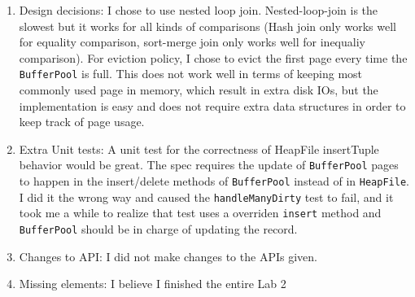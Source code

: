 \documentclass[10pt]{myland}
\begin{document}
\begin{enumerate}[label=\textbf{\arabic*.}, listparindent=0.0em, itemsep=1em]
    \item Design decisions: I chose to use nested loop join. Nested-loop-join is the slowest but it works for all kinds
        of comparisons (Hash join only works well for equality comparison, sort-merge join only works well for inequaliy
        comparison). For eviction policy, I chose to evict the first page every time the \texttt{BufferPool} is full.
        This does not work well in terms of keeping most commonly used page in memory, which result in extra disk IOs,
        but the implementation is easy and does not require extra data structures in order to keep track of page usage.

    \item Extra Unit tests: A unit test for the correctness of HeapFile insertTuple behavior would be great. The spec
        requires the update of \texttt{BufferPool} pages to happen in the insert/delete methods of \texttt{BufferPool}
        instead of in \texttt{HeapFile}. I did it the wrong way and caused the \texttt{handleManyDirty} test to fail, and
        it took me a while to realize that test uses a overriden \texttt{insert} method and \texttt{BufferPool} should
        be in charge of updating the record.

    \item Changes to API: I did not make changes to the APIs given.

    \item Missing elements: I believe I finished the entire Lab 2
\end{enumerate}
\end{document}
